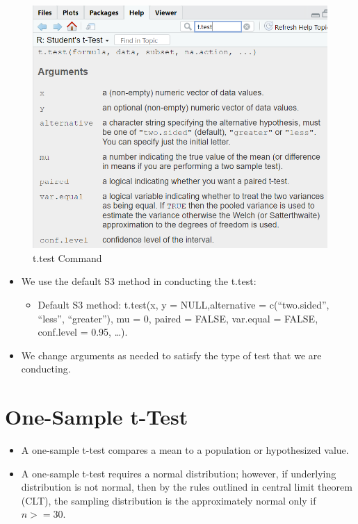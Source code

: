 \documentclass[
  letterpaper,
  DIV=11,
  numbers=noendperiod]{scrreprt}
\providecommand{\tightlist}{%
  \setlength{\itemsep}{0pt}\setlength{\parskip}{0pt}}\usepackage{longtable,booktabs,array}
\begin{document}
\begin{figure}[H]

{\centering \includegraphics{Pictures/Ch6/tTest.png}

}

\caption{t.test Command}

\end{figure}%

\begin{itemize}
\tightlist
\item
  We use the default S3 method in conducting the t.test:

  \begin{itemize}
  \tightlist
  \item
    Default S3 method: t.test(x, y = NULL,alternative = c(``two.sided'',
    ``less'', ``greater''), mu = 0, paired = FALSE, var.equal = FALSE,
    conf.level = 0.95, \ldots).
  \end{itemize}
\item
  We change arguments as needed to satisfy the type of test that we are
  conducting.
\end{itemize}


\chapter{One-Sample t-Test}\label{one-sample-t-test}

\begin{itemize}
\tightlist
\item
  A one-sample t-test compares a mean to a population or hypothesized
  value.
\item
  A one-sample t-test requires a normal distribution; however, if
  underlying distribution is not normal, then by the rules outlined in
  central limit theorem (CLT), the sampling distribution is the
  approximately normal only if \(n >= 30\).
\end{itemize}
\end{document}
